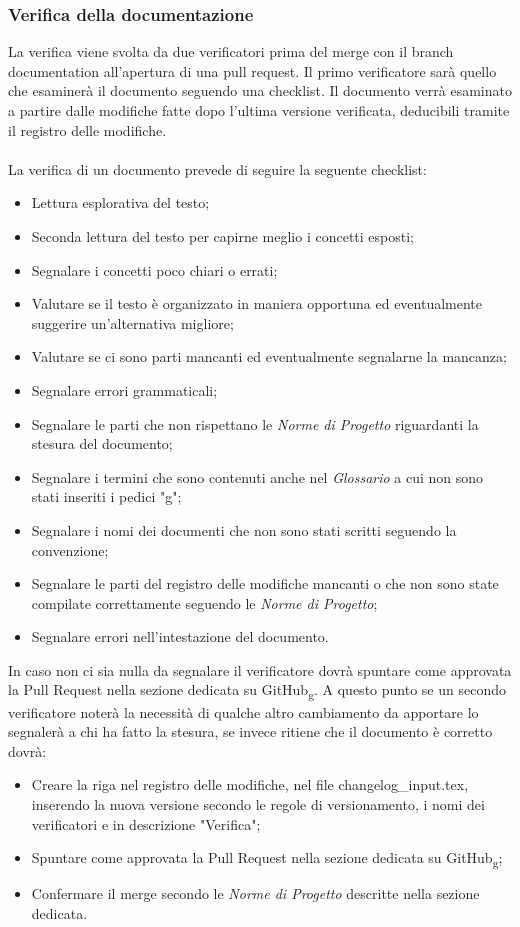 \subsubsection{Verifica della documentazione}
La verifica viene svolta da due verificatori prima del merge con il branch documentation all'apertura di una pull request.
Il primo verificatore sarà quello che esaminerà il documento seguendo una checklist. Il documento verrà esaminato a partire dalle modifiche fatte dopo l'ultima versione verificata, 
deducibili tramite il registro delle modifiche.
\\\\
La verifica di un documento prevede di seguire la seguente checklist:
\begin{itemize}
    \item Lettura esplorativa del testo;
    \item Seconda lettura del testo per capirne meglio i concetti esposti;
    \item Segnalare i concetti poco chiari o errati;
    \item Valutare se il testo è organizzato in maniera opportuna ed eventualmente suggerire un'alternativa migliore;
    \item Valutare se ci sono parti mancanti ed eventualmente segnalarne la mancanza;
    \item Segnalare errori grammaticali;
    \item Segnalare le parti che non rispettano le \textit{Norme di Progetto} riguardanti la stesura del documento;
    \item Segnalare i termini che sono contenuti anche nel \textit{Glossario} a cui non sono stati inseriti i pedici "g";
    \item Segnalare i nomi dei documenti che non sono stati scritti seguendo la convenzione;
    \item Segnalare le parti del registro delle modifiche mancanti o che non sono state compilate correttamente seguendo le \textit{Norme di Progetto};
    \item Segnalare errori nell'intestazione del documento.
\end{itemize}
In caso non ci sia nulla da segnalare il verificatore dovrà spuntare come approvata la Pull Request nella sezione 
dedicata su GitHub\textsubscript{g}. 
A questo punto se un secondo verificatore noterà la necessità di qualche altro cambiamento da apportare lo segnalerà a 
chi ha fatto la stesura, se invece ritiene che il documento è corretto dovrà:
\begin{itemize}
    \item Creare la riga nel registro delle modifiche, nel file changelog\_input.tex, inserendo la nuova versione secondo le regole di versionamento, i nomi dei verificatori e in descrizione "Verifica";
    \item Spuntare come approvata la Pull Request nella sezione dedicata su GitHub\textsubscript{g};
    \item Confermare il merge secondo le \textit{Norme di Progetto} descritte nella sezione dedicata.
\end{itemize}
